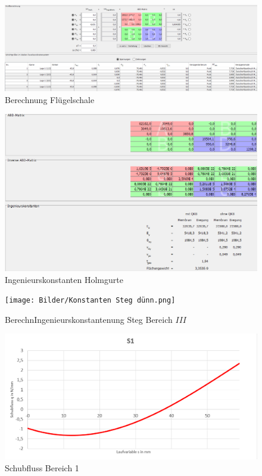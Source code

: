 \begin{figure}
	\includegraphics[width=1.0\textwidth]{Bilder/Berechnung Haut.png}
	\caption{Berechnung Flügelschale}
	\label{fig:Berechnung Haut}
\end{figure}
\begin{figure}
	\includegraphics[width=1.0\textwidth]{Bilder/Konstanten Holmgurte.png}
	\caption{Ingenieurskonstanten Holmgurte}
	\label{fig:Ingenieurskonstanten Holmgurte}
\end{figure}
\begin{figure}
	\texttt{[image: Bilder/Konstanten Steg dünn.png]}
	\caption{BerechnIngenieurskonstantenung Steg Bereich $III$}
	\label{fig:Ingenieurskonstanten Steg dünn}
\end{figure}
\begin{figure}
	\includegraphics[width=1.0\textwidth]{Bilder/S1.png}
	\caption{Schubfluss Bereich 1}
	\label{fig:S1}
\end{figure}
